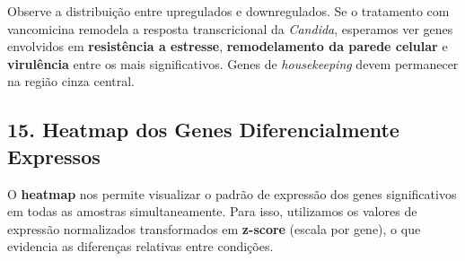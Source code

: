 \documentclass[
  letterpaper,
  DIV=11,
  numbers=noendperiod]{scrreprt}
\begin{document}
\begin{tcolorbox}[enhanced jigsaw, arc=.35mm, colframe=quarto-callout-tip-color-frame, breakable, bottomrule=.15mm, colback=white, left=2mm, titlerule=0mm, opacityback=0, title=\textcolor{quarto-callout-tip-color}{\faLightbulb}\hspace{0.5em}{O que o Volcano Plot nos diz biologicamente?}, leftrule=.75mm, colbacktitle=quarto-callout-tip-color!10!white, bottomtitle=1mm, toprule=.15mm, toptitle=1mm, rightrule=.15mm, opacitybacktitle=0.6, coltitle=black]

Observe a distribuição entre upregulados e downregulados. Se o
tratamento com vancomicina remodela a resposta transcricional da
\emph{Candida}, esperamos ver genes envolvidos em \textbf{resistência a
estresse}, \textbf{remodelamento da parede celular} e
\textbf{virulência} entre os mais significativos. Genes de
\emph{housekeeping} devem permanecer na região cinza central.

\end{tcolorbox}

\subsection{15. Heatmap dos Genes Diferencialmente
Expressos}\label{heatmap-dos-genes-diferencialmente-expressos}

O \textbf{heatmap} nos permite visualizar o padrão de expressão dos
genes significativos em todas as amostras simultaneamente. Para isso,
utilizamos os valores de expressão normalizados transformados em
\textbf{z-score} (escala por gene), o que evidencia as diferenças
relativas entre condições.
\end{document}
